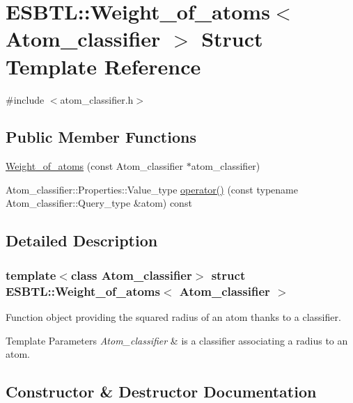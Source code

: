 \hypertarget{structESBTL_1_1Weight__of__atoms}{}\section{E\+S\+B\+TL\+:\+:Weight\+\_\+of\+\_\+atoms$<$ Atom\+\_\+classifier $>$ Struct Template Reference}
\label{structESBTL_1_1Weight__of__atoms}


{\ttfamily \#include $<$atom\+\_\+classifier.\+h$>$}

\subsection*{Public Member Functions}
\begin{DoxyCompactItemize}
\item 
\hyperlink{structESBTL_1_1Weight__of__atoms_a2225642c3cf2657680ac3ff82baf9e19}{Weight\+\_\+of\+\_\+atoms} (const Atom\+\_\+classifier $\ast$atom\+\_\+classifier)
\item 
Atom\+\_\+classifier\+::\+Properties\+::\+Value\+\_\+type \hyperlink{structESBTL_1_1Weight__of__atoms_adb65094d02fcf53a86e272c34ded0643}{operator()} (const typename Atom\+\_\+classifier\+::\+Query\+\_\+type \&atom) const
\end{DoxyCompactItemize}


\subsection{Detailed Description}
\subsubsection*{template$<$class Atom\+\_\+classifier$>$\newline
struct E\+S\+B\+T\+L\+::\+Weight\+\_\+of\+\_\+atoms$<$ Atom\+\_\+classifier $>$}

Function object providing the squared radius of an atom thanks to a classifier. 
\begin{DoxyTemplParams}{Template Parameters}
{\em Atom\+\_\+classifier} & is a classifier associating a radius to an atom. \\
\hline
\end{DoxyTemplParams}


\subsection{Constructor \& Destructor Documentation}
\mbox{\label{structESBTL_1_1Weight__of__atoms_a2225642c3cf2657680ac3ff82baf9e19}} 
